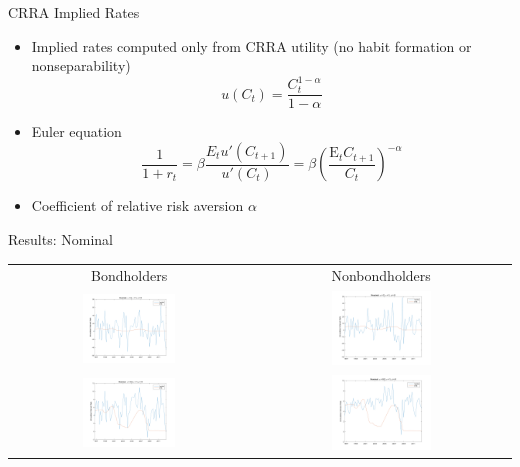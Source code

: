 \documentclass{beamer}
\def\E{\text{E}}
\begin{document}
\begin{frame}{CRRA Implied Rates}
\begin{itemize}
\item Implied rates computed only from CRRA utility (no habit formation or nonseparability) $$u(C_t) = \frac{C_t^{1-\alpha}}{1-\alpha}$$
\item Euler equation $$\frac{1}{1+r_t} = \beta \frac{E_t u'(C_{t+1})}{u'(C_t)} = \beta \left( \frac{\E_t C_{t+1}}{C_t} \right)^{-\alpha}$$
\item Coefficient of relative risk aversion $\alpha$
\end{itemize}
\end{frame}

\begin{frame}{Results: Nominal}
\begin{center}
\begin{tabular}{cc}
Bondholders & Nonbondholders \\
\includegraphics[width=0.4\textwidth]{figs/implied-vs-ffr/cex-bondholders/nominal_alpha2} & \includegraphics[width=0.4\textwidth]{figs/implied-vs-ffr/cex-nonbondholders/nominal_alpha2} \\
\includegraphics[width=0.4\textwidth]{figs/implied-vs-ffr/cex-bondholders/nominal_alpha_point2} & \includegraphics[width=0.4\textwidth]{figs/implied-vs-ffr/cex-nonbondholders/nominal_alpha_point2}
\end{tabular}
\end{center}
\end{frame}
\end{document}
